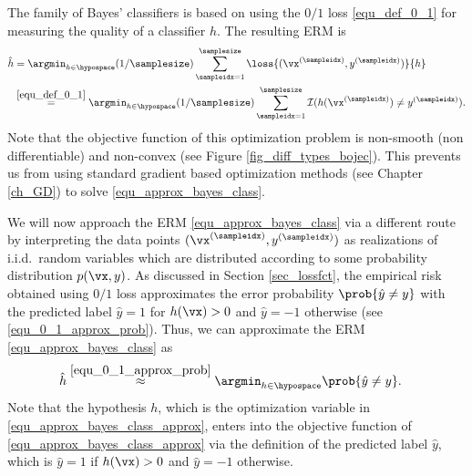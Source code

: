 \documentclass[12pt]{report}
\begin{document}
 The family of Bayes' classifiers is based on using the $0/1$ loss \eqref{equ_def_0_1} for 
 measuring the quality of a classifier $h$. The resulting ERM is 
\begin{align}
\label{equ_approx_bayes_class}
\hat{h} & = \argmin_{h \in \hypospace} (1/\samplesize) \sum_{\sampleidx=1}^{\samplesize} \loss{(\vx^{(\sampleidx)},y^{(\sampleidx)})}{h}   \nonumber \\ 
                      & \stackrel{\eqref{equ_def_0_1}}{=}  \argmin_{h \in \hypospace} (1/\samplesize) \sum_{\sampleidx=1}^{\samplesize} \mathcal{I} ( h(\vx^{(\sampleidx)}) \neq y^{(\sampleidx)}). %
\end{align}
Note that the objective function of this optimization problem is non-smooth 
(non differentiable) and non-convex (see Figure \ref{fig_diff_types_bojec}). 
This prevents us from using standard gradient based optimization methods 
(see Chapter \ref{ch_GD}) to solve \eqref{equ_approx_bayes_class}.

We will now approach the ERM \eqref{equ_approx_bayes_class} via a different 
route by interpreting the data points $(\vx^{(\sampleidx)},y^{(\sampleidx)})$ as 
realizations of i.i.d.\ random variables which are distributed according to some 
probability distribution $p(\vx,y)$. As discussed in Section \ref{sec_lossfct}, the 
empirical risk obtained using $0/1$ loss approximates the error probability $\prob { \hat{y} \neq y }$ 
with the predicted label $\hat{y} = 1$ for $h(\vx) > 0$ and $\hat{y} = -1$ otherwise (see \eqref{equ_0_1_approx_prob}). 
Thus, we can approximate the ERM \eqref{equ_approx_bayes_class} as 
\begin{align}
\label{equ_approx_bayes_class_approx}
\hat{h}    & \stackrel{\eqref{equ_0_1_approx_prob}}{\approx}\argmin_{h \in \hypospace} \prob{ \hat{y} \neq y} . 
\end{align}
Note that the hypothesis $h$, which is the optimization variable 
in \eqref{equ_approx_bayes_class_approx}, enters into the objective 
function of \eqref{equ_approx_bayes_class_approx} via the definition 
of the predicted label $\hat{y}$, which is $\hat{y} = 1 $ if $h(\vx) > 0$ 
and $\hat{y} =-1$ otherwise. 
\end{document}
